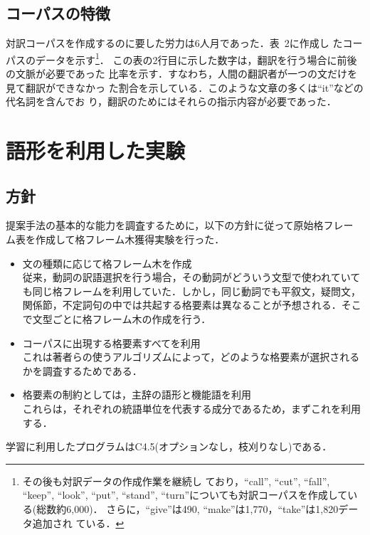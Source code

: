 \subsection{コーパスの特徴}

対訳コーパスを作成するのに要した労力は6人月であった．表~2に作成し
たコーパスのデータを示す\footnote{その後も対訳データの作成作業を継続し
  ており，``call'', ``cut'', ``fall'', ``keep'', ``look'', ``put'',
  ``stand'', ``turn''についても対訳コーパスを作成している(総数約6,000)．
  さらに，``give''は490, ``make''は1,770，``take''は1,820データ追加され
  ている．}．
この表の2行目に示した数字は，翻訳を行う場合に前後の文脈が必要であった
比率を示す．すなわち，人間の翻訳者が一つの文だけを見て翻訳ができなかっ
た割合を示している．このような文章の多くは``it''などの代名詞を含んでお
り，翻訳のためにはそれらの指示内容が必要であった．

\section{語形を利用した実験}

\subsection{方針}

提案手法の基本的な能力を調査するために，以下の方針に従って原始格フレー
ム表を作成して格フレーム木獲得実験を行った\cite{TanAndEha93,Tan94a}．
\begin{itemize}
\item 文の種類に応じて格フレーム木を作成\\
  従来，動詞の訳語選択を行う場合，その動詞がどういう文型で使われていて
  も同じ格フレームを利用していた．しかし，同じ動詞でも平叙文，疑問文，
  関係節，不定詞句の中では共起する格要素は異なることが予想される．そこ
  で文型ごとに格フレーム木の作成を行う．

\item コーパスに出現する格要素すべてを利用\\
  これは著者らの使うアルゴリズムによって，どのような格要素が選択される
  かを調査するためである．

\item 格要素の制約としては，主辞の語形と機能語を利用\\
  これらは，それぞれの統語単位を代表する成分であるため，まずこれを利用
  する．
\end{itemize}
学習に利用したプログラムはC4.5(オプションなし，枝刈りなし)である．

